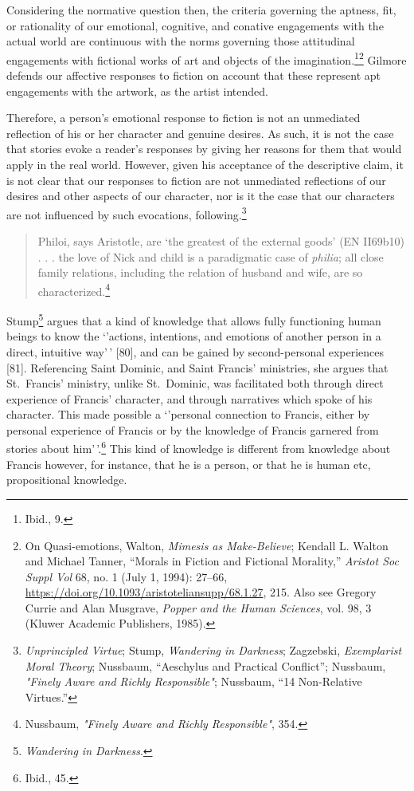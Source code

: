 \documentclass[phdthesis,12pt,final,a4paper]{wuthesis}
\theoremstyle{definition}
\theoremstyle{definition}
\theoremstyle{definition}
\theoremstyle{definition}
\theoremstyle{remark}
\begin{document}
Considering the normative question then, the criteria governing the aptness, fit, or rationality of our emotional, cognitive, and conative engagements with the actual world are continuous with the norms governing those attitudinal engagements with fictional works of art and objects of the imagination.\footnote{Ibid., 9.}\footnote{On Quasi-emotions, Walton, \emph{Mimesis as {Make-Believe}}; Kendall L. Walton and Michael Tanner, {``Morals in {Fiction} and {Fictional Morality},''} \emph{Aristot Soc Suppl Vol} 68, no. 1 (July 1, 1994): 27--66, \url{https://doi.org/10.1093/aristoteliansupp/68.1.27}, 215. Also see Gregory Currie and Alan Musgrave, \emph{Popper and the Human Sciences}, vol. 98, 3 (Kluwer Academic Publishers, 1985).} Gilmore defends our affective responses to fiction on account that these represent apt engagements with the artwork, as the artist intended.

Therefore, a person's emotional response to fiction is not an unmediated reflection of his or her character and genuine desires. As such, it is not the case that stories evoke a reader's responses by giving her reasons for them that would apply in the real world. However, given his acceptance of the descriptive claim, it is not clear that our responses to fiction are not unmediated reflections of our desires and other aspects of our character, nor is it the case that our characters are not influenced by such evocations, following.\footnote{\emph{Unprincipled {Virtue}}; Stump, \emph{Wandering in {Darkness}}; Zagzebski, \emph{Exemplarist {Moral Theory}}; Nussbaum, {``Aeschylus and Practical Conflict''}; Nussbaum, \emph{"{Finely Aware} and {Richly Responsible}"}; Nussbaum, {``14 {Non-Relative Virtues}.''}}

\begin{quote}
Philoi, says Aristotle, are `the greatest of the external goods' (EN II69b10) . . . the love of Nick and child is a paradigmatic case of \emph{philia}; all close family relations, including the relation of husband and wife, are so characterized.\footnote{Nussbaum, \emph{"{Finely Aware} and {Richly Responsible}"}, 354.}
\end{quote}

Stump\footnote{\emph{Wandering in {Darkness}}.} argues that a kind of knowledge that allows fully functioning human beings to know the `'actions, intentions, and emotions of another person in a direct, intuitive way'\,' {[}80{]}, and can be gained by second-personal experiences
{[}81{]}. Referencing Saint Dominic, and Saint Francis' ministries, she argues that St.~Francis' ministry, unlike St.~Dominic, was facilitated both through direct experience of Francis' character, and through narratives which spoke of his character. This made possible a `'personal connection to Francis, either by personal experience of Francis or by the knowledge of Francis garnered from stories about him'\,'.\footnote{Ibid., 45.} This kind of knowledge is different from knowledge about Francis however, for instance, that he is a person, or that he is human etc, propositional knowledge.
\end{document}
